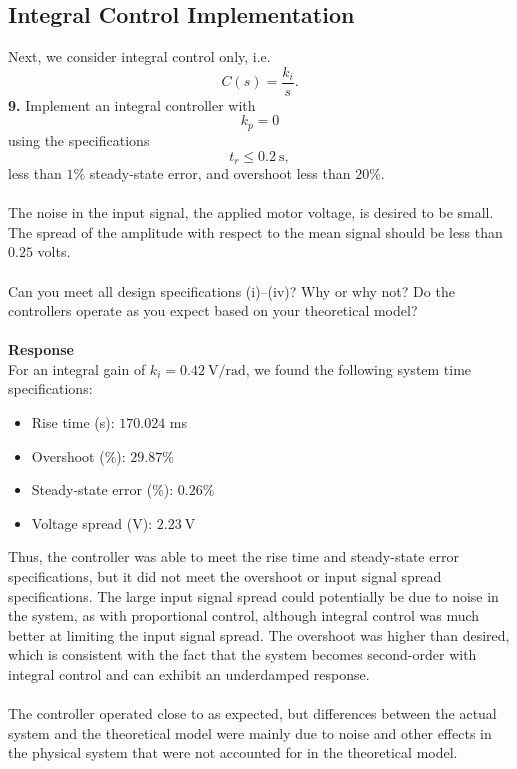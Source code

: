 ﻿\documentclass[12pt]{article}
\begin{document}
\subsection*{Integral Control Implementation}
Next, we consider integral control only, i.e.
\[
C(s)=\frac{k_i}{s}.
\]
\textbf{9.} Implement an integral controller with
\[
k_p=0
\]
using the specifications
\[
t_r \leq 0.2~\mathrm{s},
\]
less than $1\%$ steady-state error, and overshoot less than $20\%$.\\\\
The noise in the input signal, the applied motor voltage, is desired to be small. The spread of the amplitude with respect to the mean signal should be less than $0.25$ volts.\\\\
Can you meet all design specifications (i)--(iv)? Why or why not? Do the controllers operate as you expect based on your theoretical model?\\\\
\textbf{Response}\\
For an integral gain of $k_i = 0.42~\mathrm{V/rad}$, we found the following system time specifications:
\begin{itemize}
    \item Rise time (s): $170.024$ ms
    \item Overshoot (\%): $29.87\%$
    \item Steady-state error (\%): $0.26\%$
    \item Voltage spread (V): $2.23~\mathrm{V}$
\end{itemize}
Thus, the controller was able to meet the rise time and steady-state error specifications, but it did not meet the overshoot or input signal spread specifications. The large input signal spread could potentially be due to noise in the system, as with proportional control, although integral control was much better at limiting the input signal spread. The overshoot was higher than desired, which is consistent with the fact that the system becomes second-order with integral control and can exhibit an underdamped response.\\\\
The controller operated close to as expected, but differences between the actual system and the theoretical model were mainly due to noise and other effects in the physical system that were not accounted for in the theoretical model.
\newpage
\end{document}
